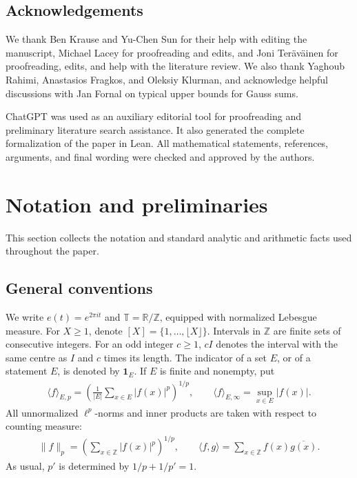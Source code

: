 \documentclass[12pt,reqno]{amsart}
\numberwithin{equation}{section}
\theoremstyle{definition}
\theoremstyle{remark}
\begin{document}
\subsection*{Acknowledgements}

We thank Ben Krause and Yu-Chen Sun for their help with editing
the manuscript, Michael Lacey for proofreading and edits, and
Joni Ter\"av\"ainen for proofreading, edits, and help with the
literature review. We also thank Yaghoub Rahimi, Anastasios
Fragkos, and Oleksiy Klurman, and acknowledge helpful discussions
with Jan Fornal on typical upper bounds for Gauss sums.

ChatGPT was used as an auxiliary editorial tool for proofreading
and preliminary literature search assistance. It also generated
the complete formalization of the paper in Lean.
All mathematical statements, references, arguments, and final
wording were checked and approved by the authors.


\section{Notation and preliminaries}\label{ss:notaion}

This section collects the notation and standard analytic and arithmetic facts used throughout the paper.

\subsection{General conventions}

We write $e(t)=e^{2\pi it}$ and $\mathbb T=\mathbb R/\mathbb Z$, equipped
with normalized Lebesgue measure.  For $X\geq1$, denote $ [X]=\{1,\ldots,\lfloor X\rfloor\}.$
Intervals in $\mathbb Z$ are finite sets of consecutive integers. For an odd integer \(c\geq1\), \(cI\) denotes the interval
with the same centre as \(I\) and \(c\) times its length.  The indicator of a set $E$, or of a statement $E$, is
denoted by $\mathbf1_E$.  If $E$ is finite and nonempty, put
\begin{align*}
 \langle f\rangle_{E,p}
 =\left(\frac1{|E|}\sum_{x\in E}|f(x)|^p\right)^{1/p},
 \qquad
 \langle f\rangle_{E,\infty}=\sup_{x\in E}|f(x)|.
\end{align*}
All unnormalized $\ell^p$-norms and inner products are taken with
respect to counting measure:
\begin{align*}
 \|f\|_p=\left(\sum_{x\in\mathbb Z}|f(x)|^p\right)^{1/p},
 \qquad \langle f,g\rangle=\sum_{x\in\mathbb Z}f(x)\overline{g(x)}.
\end{align*}
As usual, $p'$ is determined by $1/p+1/p'=1$.
\end{document}
